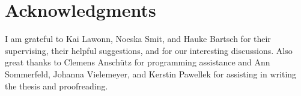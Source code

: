\documentclass[crop=false]{standalone}
\begin{document}


  \section*{Acknowledgments}
  \thispagestyle{empty}
  I am grateful to Kai Lawonn, Noeska Smit, and Hauke Bartsch for their supervising, their helpful suggestions, and for our interesting discussions.
  Also great thanks to Clemens Anschütz for programming assistance and Ann Sommerfeld, Johanna Vielemeyer, and Kerstin Pawellek for assisting in writing the thesis and proofreading.
  \restoregeometry
\end{document}

